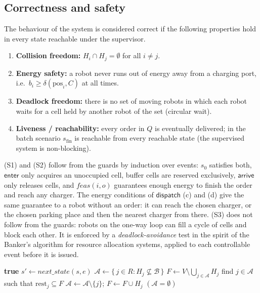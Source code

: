 \documentclass[11pt,a4paper]{article}
\newcommand{\ev}[1]{\mathsf{#1}}            %
\newcommand{\pos}{\mathrm{pos}}
\newcommand{\rest}{\mathrm{rest}}
\newcommand{\Bf}{\mathcal{B}}
\begin{document}
\subsection{Correctness and safety}\label{sec:safety}

The behaviour of the system is considered correct if the following properties
hold in every state reachable under the supervisor.
\begin{enumerate}[label=\textbf{(S\arabic*)},leftmargin=*]
  \item \textbf{Collision freedom:} $H_i\cap H_j=\emptyset$ for all $i\neq j$.
  \item \textbf{Energy safety:} a robot never runs out of energy away from a
        charging port, i.e.\ $b_i\ge\delta(\pos_i,C)$ at all times.
  \item \textbf{Deadlock freedom:} there is no set of moving robots in which
        each robot waits for a cell held by another robot of the set
        (circular wait).
  \item[\textbf{(L)}] \textbf{Liveness / reachability:} every order in $Q$ is
        eventually delivered; in the batch scenario $s_{\mathrm{fin}}$ is
        reachable from every reachable state (the supervised system is
        non-blocking).
\end{enumerate}

(S1) and (S2) follow from the guards by induction over events: $s_0$
satisfies both, $\ev{enter}$ only acquires an unoccupied cell, buffer cells
are reserved exclusively, $\ev{arrive}$ only releases cells, and
$\mathit{feas}(i,o)$ guarantees enough energy to finish the order and reach
any charger. The energy conditions of $\ev{dispatch}$ (c) and (d) give the same
guarantee to a robot without an order: it can reach the chosen charger, or the
chosen parking place and then the nearest charger from there. (S3) does not follow from the guards: robots on the one-way loop
can fill a cycle of cells and block each other. It is enforced by a
\emph{deadlock-avoidance} test in the spirit of the Banker's algorithm for
resource allocation systems, applied to each controllable event before it is
issued.

\begin{algorithm}[H]
\caption{$\mathit{safe}(s,e)$ -- deadlock-avoidance test}\label{alg:safe}
\begin{algorithmic}[1]
\If{$e$ is not of the form $\ev{enter}(i,v)$} \Return \textbf{true}
\EndIf
\State $s' \gets \mathit{next\_state}(s,e)$
\State $\mathcal{A} \gets \{\, j\in R : H_j \not\subseteq \Bf \,\}$
\State $F \gets V \setminus \bigcup_{j\in\mathcal{A}} H_j$
\Repeat
  \State find $j\in\mathcal{A}$ such that $\rest_j \subseteq F$
     \State $\mathcal{A}\gets\mathcal{A}\setminus\{j\}$;\; $F\gets F\cup H_j$
  \EndIf
{}
\State \Return $(\mathcal{A}=\emptyset)$
\end{algorithmic}
\end{algorithm}
\end{document}

